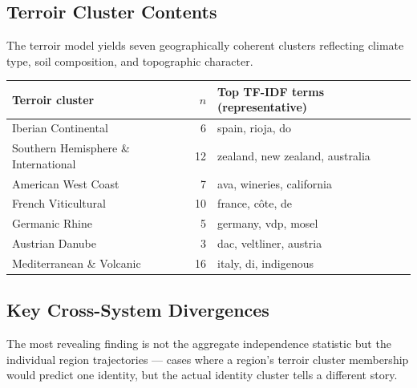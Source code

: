 \documentclass[11pt]{article}
\begin{document}
\subsection{Terroir Cluster Contents}
The terroir model yields seven geographically coherent clusters reflecting climate type, soil composition, and topographic character.

\begin{center}
\begin{tabular}{@{}lrp{8.0cm}@{}}
\toprule
Terroir cluster & $n$ & Top TF-IDF terms (representative) \\
\midrule
Iberian Continental                 &  6 & spain, rioja, do \\
Southern Hemisphere \& International & 12 & zealand, new zealand, australia \\
American West Coast                 &  7 & ava, wineries, california \\
French Viticultural                 & 10 & france, c\^ote, de \\
Germanic Rhine                      &  5 & germany, vdp, mosel \\
Austrian Danube                     &  3 & dac, veltliner, austria \\
Mediterranean \& Volcanic           & 16 & italy, di, indigenous \\
\bottomrule
\end{tabular}
\end{center}

\subsection{Key Cross-System Divergences}
The most revealing finding is not the aggregate independence statistic but the individual region trajectories --- cases where a region's terroir cluster membership would predict one identity, but the actual identity cluster tells a different story.
\end{document}
